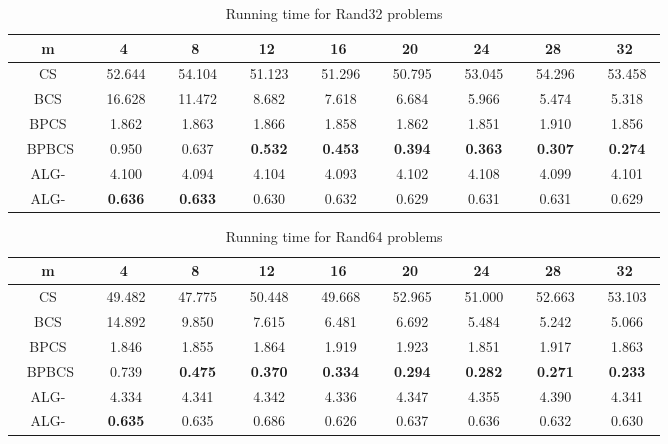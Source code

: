 \documentclass{llncs}
\newcommand{\rom}[1]{\uppercase\expandafter{\romannumeral #1\relax}}
\begin{document}
{\begin{table}
\begin{center}
\begin{tabular}{|c|c|c|c|c|c|c|c|c|}
\hline
m&4&8&12&16&20&24&28&32\\
\hline
CS &~ 52.644~ &~ 54.104~ &~ 51.123~ &~ 51.296~ &~ 50.795~ &~ 53.045~ &~ 54.296~ &~ 53.458~ \\
\hline
BCS &~ 16.628~ &~ 11.472~ &~ 8.682~ &~ 7.618~ &~ 6.684~ &~ 5.966~ &~ 5.474~ &~ 5.318~ \\
\hline
BPCS &~ 1.862~ &~ 1.863~ &~ 1.866~ &~ 1.858~ &~ 1.862~ &~ 1.851~ &~ 1.910~ &~ 1.856~ \\
\hline
~ BPBCS~ &~ 0.950~ &~ 0.637~ &~ \textbf{0.532}~ &~ \textbf{0.453}~ &~ \textbf{0.394}~ &~ \textbf{0.363}~ &~ \textbf{0.307}~ &~ \textbf{0.274}~ \\
\hline 
ALG-\rom{2} &~ 4.100~ &~ 4.094~ &~ 4.104~ &~ 4.093~ &~ 4.102~ &~ 4.108~ &~ 4.099~ &~ 4.101~ \\
\hline
ALG-\rom{1} &~ \textbf{0.636}~ &~ \textbf{0.633}~ &~ 0.630~ &~ 0.632~ &~ 0.629~ &~ 0.631~ &~ 0.631~ &~ 0.629~ \\
\hline
\end{tabular}
\caption{Running time for Rand32 problems}
\label{Rand32}
\end{center}
\end{table}


\begin{table}
\begin{center}
\begin{tabular}{|c|c|c|c|c|c|c|c|c|}
\hline
m&4&8&12&16&20&24&28&32\\
\hline
CS &~ 49.482~ &~ 47.775~ &~ 50.448~ &~ 49.668~ &~ 52.965~ &~ 51.000~ &~ 52.663~ &~ 53.103~ \\
\hline
BCS &~ 14.892~ &~ 9.850~ &~ 7.615~ &~ 6.481~ &~ 6.692~ &~ 5.484~ &~ 5.242~ &~ 5.066~ \\
\hline
BPCS &~ 1.846~ &~ 1.855~ &~ 1.864~ &~ 1.919~ &~ 1.923~ &~ 1.851~ &~ 1.917~ &~ 1.863~ \\
\hline
~ BPBCS~ &~ 0.739~ &~ \textbf{0.475}~ &~ \textbf{0.370}~ &~ \textbf{0.334}~ &~ \textbf{0.294}~ &~ \textbf{0.282}~ &~ \textbf{0.271}~ &~ \textbf{0.233}~ \\
\hline
ALG-\rom{2} &~ 4.334~ &~ 4.341~ &~ 4.342~ &~ 4.336~ &~ 4.347~ &~ 4.355~ &~ 4.390~ &~ 4.341~ \\
\hline
ALG-\rom{1} &~ \textbf{0.635}~ &~ 0.635~ &~ 0.686~ &~ 0.626~ &~ 0.637~ &~ 0.636~ &~ 0.632~ &~ 0.630~ \\
\hline
\end{tabular}
\caption{Running time for Rand64 problems}
\label{Rand64}
\end{center}
\end{table}



}
\end{document}
